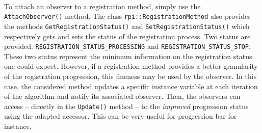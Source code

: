 \\
To attach an observer to a registration method, simply use the \texttt{AttachObserver()} method. The class \texttt{rpi::RegistrationMethod} also provides the methods \texttt{GetRegistrationStatus()} and \texttt{SetRegistrationStatus()} which respectively gets and sets the status of the registration process. Two status are provided: \texttt{REGISTRATION\_STATUS\_PROCESSING} and \texttt{REGISTRATION\_STATUS\_STOP}. These two status represent the minimum information on the registration status one could expect. However, if a registration method provides a better granularity of the registration progression, this fineness may be used by the observer. In this case, the considered method updates a specific instance variable at each iteration of the algorithm and notify its associated observer. Then, the observers can access -- directly in the \texttt{Update()} method -- to the \textit{improved} progression status using the adapted accessor. This can be very useful for progression bar for instance.

